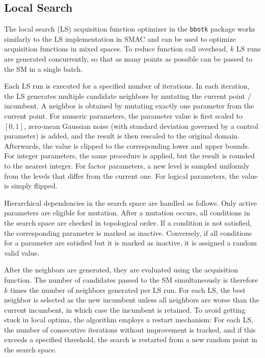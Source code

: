 \subsection*{Local Search}
\label{sec:local-search}

The local search (LS) acquisition function optimizer in the \texttt{bbotk} package works similarly to the LS implementation in SMAC\cite{lindauer2022} and can be used to optimize acquisition functions in mixed spaces.
To reduce function call overhead, $k$ LS runs are generated concurrently, so that as many points as possible can be passed to the SM in a single batch.

Each LS run is executed for a specified number of iterations.
In each iteration, the LS generates multiple candidate neighbors by mutating the current point / incumbent.
A neighbor is obtained by mutating exactly one parameter from the current point.
For numeric parameters, the parameter value is first scaled to $[0, 1]$, zero-mean Gaussian noise (with standard deviation governed by a control parameter) is added, and the result is then rescaled to the original domain.
Afterwards, the value is clipped to the corresponding lower and upper bounds.
For integer parameters, the same procedure is applied, but the result is rounded to the nearest integer.
For factor parameters, a new level is sampled uniformly from the levels that differ from the current one.
For logical parameters, the value is simply flipped.

Hierarchical dependencies in the search space are handled as follows.
Only active parameters are eligible for mutation.
After a mutation occurs, all conditions in the search space are checked in topological order.
If a condition is not satisfied, the corresponding parameter is marked as inactive.
Conversely, if all conditions for a parameter are satisfied but it is marked as inactive, it is assigned a random valid value.

After the neighbors are generated, they are evaluated using the acquisition function.
The number of candidates passed to the SM simultaneously is therefore $k$ times the number of neighbors generated per LS run. 
For each LS, the best neighbor is selected as the new incumbent unless all neighbors are worse than the current incumbent, in which case the incumbent is retained.
To avoid getting stuck in local optima, the algorithm employs a restart mechanism: 
For each LS, the number of consecutive iterations without improvement is tracked, and if this 
exceeds a specified threshold, the search is restarted from a new random point in the search space.